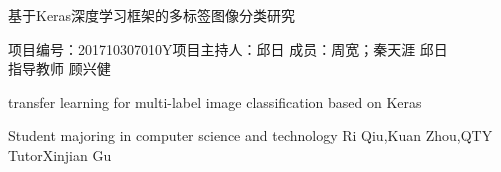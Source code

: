 \begin{center}
	 \heiti	基于Keras深度学习框架的多标签图像分类研究	\end{center}
\begin{center}
	 \fangsong	项目编号：201710307010Y项目主持人：邱日 \quad  成员：周宽；秦天涯 \quad 邱日\\	指导教师 \quad 顾兴健	\end{center}






\begin{center}
	transfer learning for multi-label image classification based on Keras  \end{center}
\begin{center}
	 Student majoring in  computer science and technology \quad Ri Qiu,Kuan Zhou,QTY\\Tutor\quad Xinjian Gu\end{center}

